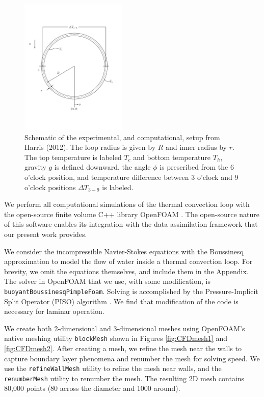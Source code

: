 \begin{figure}[h]
  \centering
  \includegraphics[width=0.45\textwidth]{figures/harris-tellus-2012-loop.pdf}
  \caption[Schematic of the experimental, and computational, setup from Harris \etal (2012)]{
    Schematic of the experimental, and computational, setup from Harris \etal (2012).
    The loop radius is given by $R$ and inner radius by $r$.
    The top temperature is labeled $T_c$ and bottom temperature $T_h$, gravity $g$ is defined downward, the angle $\phi$ is prescribed from the 6 o'clock position, and temperature difference between 3 o'clock and 9 o'clock positions $\Delta T_{3-9}$ is labeled.
  }
  \label{fig:thermosyphon-schematic}
\end{figure}

We perform all computational simulations of the thermal convection loop with the open-source finite volume C++ library OpenFOAM \cite{jasak2007}.
The open-source nature of this software enables its integration with the data assimilation framework that our present work provides.

We consider the incompressible Navier-Stokes equations with the Boussinesq approximation to model the flow of water inside a thermal convection loop.
For brevity, we omit the equations themselves, and include them in the Appendix.
The solver in OpenFOAM that we use, with some modification, is \verb|buoyantBoussinesqPimpleFoam|.
Solving is accomplished by the Pressure-Implicit Split Operator (PISO) algorithm \cite{issa1986solution}.
We find that modification of the code is necessary for laminar operation.

We create both 2-dimensional and 3-dimensional meshes using OpenFOAM's native meshing utility \verb|blockMesh| shown in Figures \ref{fig:CFDmesh1} and \ref{fig:CFDmesh2}.
After creating a mesh, we refine the mesh near the walls to capture boundary layer phenomena and renumber the mesh for solving speed.
We use the \verb|refineWallMesh| utility to refine the mesh near walls, and the \verb|renumberMesh| utility to renumber the mesh.
The resulting 2D mesh contains 80,000 points (80 across the diameter and 1000 around).

